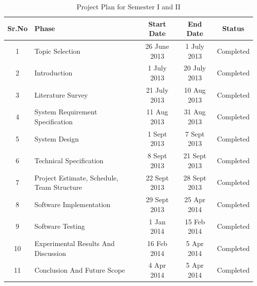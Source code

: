 \begin{table}[h]
\begin{center}
\caption{Project Plan for Semester I and II}\label{Project Plan for Semester I}
\begin{tabular}{|c|p{5cm}|c|c|c|} \hline
Sr.No & Phase & Start Date & End Date & Status\\ \hline
1 & Topic Selection & 26 June 2013 & 1 July 2013 & Completed \\		\hline
2 & Introduction & 1 July 2013 & 20 July 2013 & Completed \\		\hline
3 & Literature Survey & 21 July 2013 & 10 Aug 2013 & Completed \\		\hline
4 & System Requirement Specification & 11 Aug 2013 & 31 Aug 2013 & Completed \\		\hline
5 & System Design & 1 Sept 2013 & 7 Sept 2013 & Completed \\		\hline
6 & Technical Specification & 8 Sept 2013 & 21 Sept 2013 & Completed \\		\hline
7 & Project Estimate, Schedule, Team Structure & 22 Sept 2013 & 28 Sept 2013 & Completed \\		\hline
8 & Software Implementation & 29 Sept 2013 & 25 Apr 2014 & Completed  \\ \hline
9 & Software Testing & 1 Jan 2014 & 15 Feb 2014 & Completed  \\ \hline
10 & Experimental Results And Discussion & 16 Feb 2014 & 5 Apr 2014 & Completed \\ \hline
11 & Conclusion And Future Scope & 4 Apr 2014 & 5 Apr 2014 & Completed \\ \hline
 \end{tabular}
\end{center}
\end{table}


